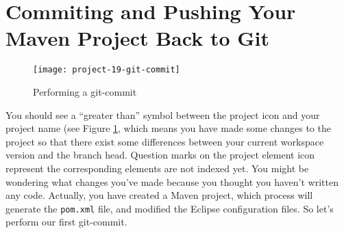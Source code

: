 
\section{Commiting and Pushing Your Maven Project Back to Git}

\begin{figure}[t]
\centering
\texttt{[image: project-19-git-commit]}
\caption{Performing a git-commit\label{project-19-git-commit}}
\end{figure}

You should see a ``greater than'' symbol between the project icon and your
project name (see Figure \ref{project-19-git-commit}, which means you have made
some changes to the project so that there exist some differences between your
current workspace version and the branch head. Question marks on the project
element icon represent the corresponding elements are not indexed yet. You might
be wondering what changes you've made because you thought you haven't written
any code. Actually, you have created a Maven project, which process will
generate the \verb|pom.xml| file, and modified the Eclipse configuration files.
So let's perform our first git-commit.

